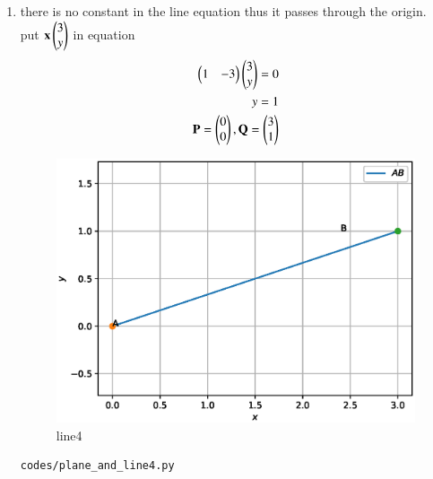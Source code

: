 \begin{enumerate}[label=\arabic*.,ref=\thesubsection.\theenumi]
\begin{enumerate}
\item there is no constant in the line equation thus it passes through the origin.
\\
put $\mathbf x \begin{pmatrix}3\\y\end{pmatrix}$ in equation
\\
\begin{align}
\begin{pmatrix}1 & -3\end{pmatrix}\begin{pmatrix}3\\y\end{pmatrix} = 0
\\
y= 1
\\
\mathbf{P} = \begin{pmatrix}0\\0\end{pmatrix}, \mathbf{Q} = \begin{pmatrix}3\\1\end{pmatrix}
\end{align}
\begin{figure}[!ht]
	\centering
	\includegraphics[width=\columnwidth]{./figures/plane_and_line4.eps}
	\caption{line4 }
	\label{fig:line4}
\end{figure}
\begin{lstlisting}
codes/plane_and_line4.py
\end{lstlisting}




\end{enumerate}
\end{enumerate}
